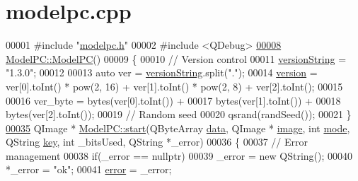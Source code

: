 \hypertarget{modelpc_8cpp_source}{}\section{modelpc.\+cpp}
\label{modelpc_8cpp_source}

\begin{DoxyCode}
00001 \textcolor{preprocessor}{#include "\mbox{\hyperlink{modelpc_8h}{modelpc.h}}"}
00002 \textcolor{preprocessor}{#include <QDebug>}
\mbox{\hyperlink{class_model_p_c_ae12ebe65ec973c02a0de4850a7c1e31c}{00008}} \mbox{\hyperlink{class_model_p_c_ae12ebe65ec973c02a0de4850a7c1e31c}{ModelPC::ModelPC}}()
00009 \{
00010     \textcolor{comment}{// Version control}
00011     \mbox{\hyperlink{class_model_p_c_a5f426725ccf7eefd3c77ea8c720264c9}{versionString}} = \textcolor{stringliteral}{"1.3.0"};
00012 
00013     \textcolor{keyword}{auto} ver = \mbox{\hyperlink{class_model_p_c_a5f426725ccf7eefd3c77ea8c720264c9}{versionString}}.split(\textcolor{stringliteral}{"."});
00014     \mbox{\hyperlink{class_model_p_c_a5af48ab89e19be42a94c34ba00249401}{version}} = ver[0].toInt() * pow(2, 16) + ver[1].toInt() * pow(2, 8) + ver[2].toInt();
00015 
00016     ver\_byte = bytes(ver[0].toInt()) +
00017             bytes(ver[1].toInt()) +
00018             bytes(ver[2].toInt());
00019     \textcolor{comment}{// Random seed}
00020     qsrand(randSeed());
00021 \}
\mbox{\hyperlink{class_model_p_c_a3cae34fd5bcb06e8c1f8cfe7961bd270}{00035}} QImage * \mbox{\hyperlink{class_model_p_c_a3cae34fd5bcb06e8c1f8cfe7961bd270}{ModelPC::start}}(QByteArray \mbox{\hyperlink{namespace_errors_dict_setup_af570460846fb9f0c91abd308a095dcdc}{data}}, QImage * \mbox{\hyperlink{namespacetests-setup_ad55b685280f549e15688a94cbb89f512}{image}}, \textcolor{keywordtype}{int} 
      \mbox{\hyperlink{namespacetests-setup_a04126d10edec6b3171e1b55a00309b23}{mode}}, QString \mbox{\hyperlink{namespace_errors_dict_setup_a09c268098d09ffb8e5504f30fa6d5dd9}{key}}, \textcolor{keywordtype}{int} \_bitsUsed, QString *\_error)
00036 \{
00037     \textcolor{comment}{// Error management}
00038     \textcolor{keywordflow}{if}(\_error == \textcolor{keyword}{nullptr})
00039         \_error = \textcolor{keyword}{new} QString();
00040     *\_error = \textcolor{stringliteral}{"ok"};
00041     \mbox{\hyperlink{class_model_p_c_a4e5a9c0ca1f06fe5bc478b6bf248c37c}{error}} = \_error;

\end{DoxyCode}
